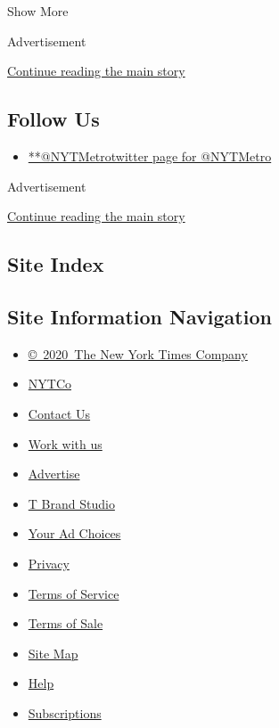 Show More

Advertisement

\protect\hyperlink{after-mid2}{Continue reading the main story}

\hypertarget{follow-us}{%
\subsection{Follow Us}\label{follow-us}}

\begin{itemize}
\tightlist
\item
  \href{https://twitter.com/NYTMetro}{**@NYTMetrotwitter page for
  @NYTMetro}
\end{itemize}

Advertisement

\protect\hyperlink{after-mktg}{Continue reading the main story}

\hypertarget{site-index}{%
\subsection{Site Index}\label{site-index}}

\hypertarget{site-information-navigation}{%
\subsection{Site Information
Navigation}\label{site-information-navigation}}

\begin{itemize}
\tightlist
\item
  \href{https://help.nytimes.com/hc/en-us/articles/115014792127-Copyright-notice}{©~2020~The
  New York Times Company}
\end{itemize}

\begin{itemize}
\tightlist
\item
  \href{https://www.nytco.com/}{NYTCo}
\item
  \href{https://help.nytimes.com/hc/en-us/articles/115015385887-Contact-Us}{Contact
  Us}
\item
  \href{https://www.nytco.com/careers/}{Work with us}
\item
  \href{https://nytmediakit.com/}{Advertise}
\item
  \href{http://www.tbrandstudio.com/}{T Brand Studio}
\item
  \href{https://www.nytimes.com/privacy/cookie-policy\#how-do-i-manage-trackers}{Your
  Ad Choices}
\item
  \href{https://www.nytimes.com/privacy}{Privacy}
\item
  \href{https://help.nytimes.com/hc/en-us/articles/115014893428-Terms-of-service}{Terms
  of Service}
\item
  \href{https://help.nytimes.com/hc/en-us/articles/115014893968-Terms-of-sale}{Terms
  of Sale}
\item
  \href{https://spiderbites.nytimes.com}{Site Map}
\item
  \href{https://help.nytimes.com/hc/en-us}{Help}
\item
  \href{https://www.nytimes.com/subscription?campaignId=37WXW}{Subscriptions}
\end{itemize}
